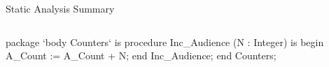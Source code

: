 \documentclass{beamer}
\begin{document}
\begin{frame}[fragile]{Static Analysis Summary}
\begin{columns}
\begin{column}{9cm}
\begin{onlyenv}
\begin{pxcode}[language=SPARK,style=magic,gobble=8]
        package `body Counters`
        is
           procedure Inc_Audience (N : Integer)
           is
           begin
              A_Count := A_Count + N;
           end Inc_Audience;
        end Counters;
      \end{pxcode}
      \end{onlyenv}

    \end{column}
  \end{columns}

\end{frame}
\end{document}
